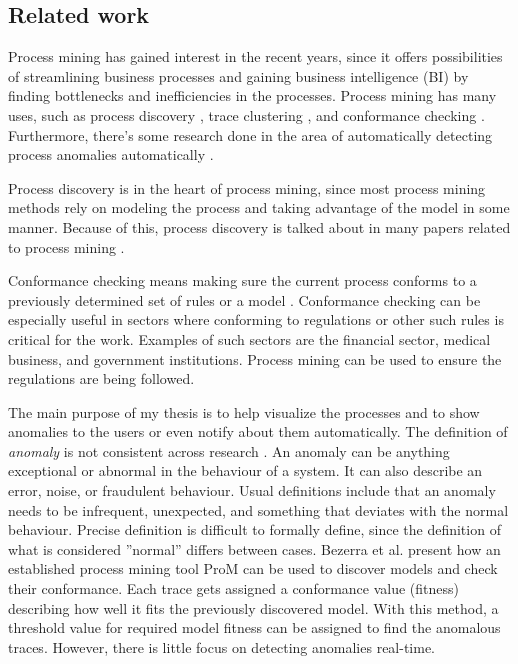 
\subsection{Related work}
\label{sec:relatedwork}

Process mining has gained interest in the recent years, since it offers possibilities of streamlining business processes and gaining business intelligence (BI) by finding bottlenecks and inefficiencies in the processes.
Process mining has many uses, such as process discovery \cite{van2016discovery, van2013discovering}, trace clustering \cite{de2016general}, and conformance checking \cite{chomyat2016process}. Furthermore, there's some research done in the area of automatically detecting process anomalies automatically \cite{bezerra2009anomaly}.

Process discovery is in the heart of process mining, since most process mining methods rely on modeling the process and taking advantage of the model in some manner.
Because of this, process discovery is talked about in many papers related to process mining \cite{chomyat2016process, de2016general, van2013discovering, van2015extracting, van2016process,bezerra2009anomaly}.

Conformance checking means making sure the current process conforms to a previously determined set of rules or a model \cite{chomyat2016process}.
Conformance checking can be especially useful in sectors where conforming to regulations or other such rules is critical for the work.
Examples of such sectors are the financial sector, medical business, and government institutions.
Process mining can be used to ensure the regulations are being followed.

The main purpose of my thesis is to help visualize the processes and to show anomalies to the users or even notify about them automatically.
The definition of \textit{anomaly} is not consistent across research \cite{bezerra2009anomaly}. 
An anomaly can be anything exceptional or abnormal in the behaviour of a system. 
It can also describe an error, noise, or fraudulent behaviour.
Usual definitions include that an anomaly needs to be infrequent, unexpected, and something that deviates with the normal behaviour.
Precise definition is difficult to formally define, since the definition of what is considered ''normal'' differs between cases. 
Bezerra et al. \cite{bezerra2009anomaly} present how an established process mining tool ProM can be used to discover models and check their conformance.
Each trace gets assigned a conformance value (fitness) describing how well it fits the previously discovered model.
With this method, a threshold value for required model fitness can be assigned to find the anomalous traces.
However, there is little focus on detecting anomalies real-time.

